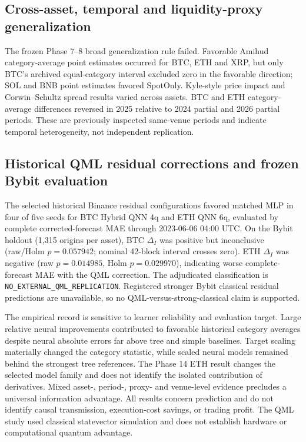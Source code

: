 \subsection{Cross-asset, temporal and liquidity-proxy generalization}
The frozen Phase 7--8 broad generalization rule failed. Favorable Amihud category-average point estimates occurred for BTC, ETH and XRP, but only BTC's archived equal-category interval excluded zero in the favorable direction; SOL and BNB point estimates favored SpotOnly. Kyle-style price impact and Corwin--Schultz spread results varied across assets. BTC and ETH category-average differences reversed in 2025 relative to 2024 partial and 2026 partial periods. These are previously inspected same-venue periods and indicate temporal heterogeneity, not independent replication.

\subsection{Historical QML residual corrections and frozen Bybit evaluation}
The selected historical Binance residual configurations favored matched MLP in four of five seeds for BTC Hybrid QNN 4q and ETH QNN 6q, evaluated by complete corrected-forecast MAE through 2023-06-06 04:00 UTC. On the Bybit holdout (1,315 origins per asset), BTC $\Delta_I$ was positive but inconclusive (raw/Holm $p=0.057942$; nominal 42-block interval crosses zero). ETH $\Delta_I$ was negative (raw $p=0.014985$, Holm $p=0.029970$), indicating worse complete-forecast MAE with the QML correction. The adjudicated classification is \texttt{NO\_EXTERNAL\_QML\_REPLICATION}. Registered stronger Bybit classical residual predictions are unavailable, so no QML-versus-strong-classical claim is supported.

The empirical record is sensitive to learner reliability and evaluation target. Large relative neural improvements contributed to favorable historical category averages despite neural absolute errors far above tree and simple baselines. Target scaling materially changed the category statistic, while scaled neural models remained behind the strongest tree references. The Phase 14 ETH result changes the selected model family and does not identify the isolated contribution of derivatives. Mixed asset-, period-, proxy- and venue-level evidence precludes a universal information advantage. All results concern prediction and do not identify causal transmission, execution-cost savings, or trading profit. The QML study used classical statevector simulation and does not establish hardware or computational quantum advantage.

